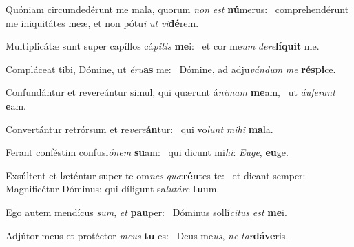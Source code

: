 \item Quóniam circumdedérunt me mala, quorum \textit{non} \textit{est} \textbf{nú}merus:~\psstar{} comprehendérunt me iniquitátes meæ, et non pótu\textit{i} \textit{ut} \textit{vi}\textbf{dé}rem.
\item Multiplicátæ sunt super capíllos cá\textit{pitis} \textbf{me}i:~\psstar{} et cor me\textit{um} \textit{dere}\textbf{lí}\textbf{quit} me.
\item Compláceat tibi, Dómine, ut \textit{éru}\textbf{as} me:~\psstar{} Dómine, ad adju\textit{vándum} \textit{me} \textbf{ré}\textbf{spi}ce.
\item Confundántur et revereántur simul, qui quærunt á\textit{nimam} \textbf{me}am,~\psstar{} ut \textit{áuferant} \textbf{e}am.
\item Convertántur retrórsum et re\textit{vere}\textbf{án}tur:~\psstar{} qui vo\textit{lunt} \textit{mihi} \textbf{ma}la.
\item Ferant conféstim confusi\textit{ónem} \textbf{su}am:~\psstar{} qui dicunt mi\textit{hi}: \textit{Euge}, \textbf{eu}ge.
\item Exsúltent et læténtur super te om\textit{nes} \textit{quæ}\textbf{rén}tes te:~\psstar{} et dicant semper: Magnificétur Dóminus: qui díligunt sa\textit{lutáre} \textbf{tu}um.
\item Ego autem mendícus \textit{sum}, \textit{et} \textbf{pau}per:~\psstar{} Dóminus sollí\textit{citus} \textit{est} \textbf{me}i.
\item Adjútor meus et protéctor \textit{meus} \textbf{tu} es:~\psstar{} Deus me\textit{us}, \textit{ne} \textit{tar}\textbf{dá}\textbf{ve}ris.
